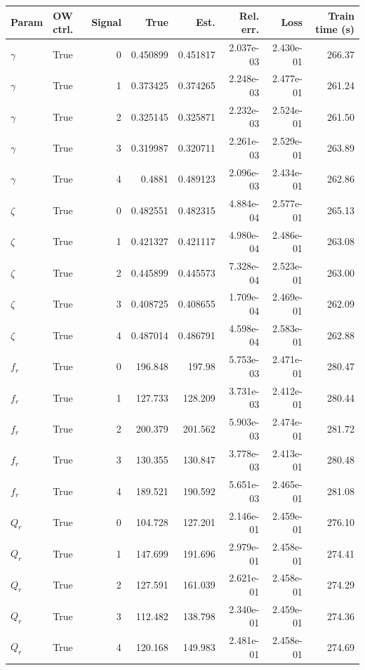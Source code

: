 \begin{tabular}{llrrrrrr}
\hline
Param & OW ctrl. & Signal & True & Est. & Rel. err. & Loss & Train time (s) \\
\hline
$\gamma$ & True & 0 & 0.450899 & 0.451817 & 2.037e-03 & 2.430e-01 & 266.37 \\
$\gamma$ & True & 1 & 0.373425 & 0.374265 & 2.248e-03 & 2.477e-01 & 261.24 \\
$\gamma$ & True & 2 & 0.325145 & 0.325871 & 2.232e-03 & 2.524e-01 & 261.50 \\
$\gamma$ & True & 3 & 0.319987 & 0.320711 & 2.261e-03 & 2.529e-01 & 263.89 \\
$\gamma$ & True & 4 & 0.4881 & 0.489123 & 2.096e-03 & 2.434e-01 & 262.86 \\
$\zeta$ & True & 0 & 0.482551 & 0.482315 & 4.884e-04 & 2.577e-01 & 265.13 \\
$\zeta$ & True & 1 & 0.421327 & 0.421117 & 4.980e-04 & 2.486e-01 & 263.08 \\
$\zeta$ & True & 2 & 0.445899 & 0.445573 & 7.328e-04 & 2.523e-01 & 263.00 \\
$\zeta$ & True & 3 & 0.408725 & 0.408655 & 1.709e-04 & 2.469e-01 & 262.09 \\
$\zeta$ & True & 4 & 0.487014 & 0.486791 & 4.598e-04 & 2.583e-01 & 262.88 \\
$f_r$ & True & 0 & 196.848 & 197.98 & 5.753e-03 & 2.471e-01 & 280.47 \\
$f_r$ & True & 1 & 127.733 & 128.209 & 3.731e-03 & 2.412e-01 & 280.44 \\
$f_r$ & True & 2 & 200.379 & 201.562 & 5.903e-03 & 2.474e-01 & 281.72 \\
$f_r$ & True & 3 & 130.355 & 130.847 & 3.778e-03 & 2.413e-01 & 280.48 \\
$f_r$ & True & 4 & 189.521 & 190.592 & 5.651e-03 & 2.465e-01 & 281.08 \\
$Q_r$ & True & 0 & 104.728 & 127.201 & 2.146e-01 & 2.459e-01 & 276.10 \\
$Q_r$ & True & 1 & 147.699 & 191.696 & 2.979e-01 & 2.458e-01 & 274.41 \\
$Q_r$ & True & 2 & 127.591 & 161.039 & 2.621e-01 & 2.458e-01 & 274.29 \\
$Q_r$ & True & 3 & 112.482 & 138.798 & 2.340e-01 & 2.459e-01 & 274.36 \\
$Q_r$ & True & 4 & 120.168 & 149.983 & 2.481e-01 & 2.458e-01 & 274.69 \\
\hline
\end{tabular}
